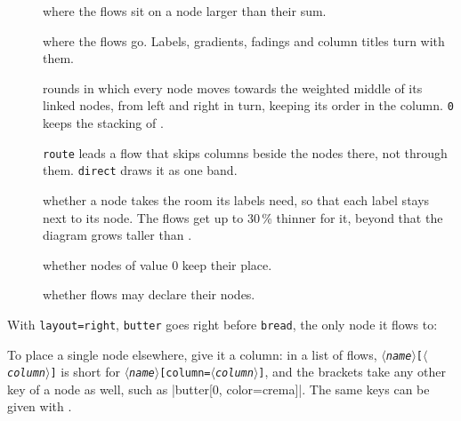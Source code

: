\documentclass[10pt,parskip=half,english,numbers=noenddot,footnotes=nomultiple,oneside]{scrartcl}
\let\T\texttt
\newcommand\meta[1]{\ensuremath{\langle}\textit{#1}\ensuremath{\rangle}}
\begin{document}
\begin{description}
\item[] where the flows sit on a node larger than their sum.
\item[] where the flows go. Labels, gradients, fadings and column titles turn with them.
\item[\key{relax}{\meta{rounds}}] rounds in which every node moves towards the weighted middle of its linked nodes, from left and right in turn, keeping its order in the column. \T{0} keeps the stacking of .
\item[] \T{route} leads a flow that skips columns beside the nodes there, not through them. \T{direct} draws it as one band.
\item[] whether a node takes the room its labels need, so that each label stays next to its node. The flows get up to 30\,\% thinner for it, beyond that the diagram grows taller than .
\item[] whether nodes of value 0 keep their place.
\item[] whether flows may declare their nodes.
\end{description}
With \T{layout=right}, \T{butter} goes right before \T{bread}, the only node it flows to:
\begin{example}
\end{example}
To place a single node elsewhere, give it a column: in a list of flows, \T{\meta{name}[\meta{column}]} is short for \T{\meta{name}[column=\meta{column}]}, and the brackets take any other key of a node as well, such as |butter[0, color=crema]|. The same keys can be given with .
\begin{example}
\end{example}
\begin{example}
\end{example}
\end{document}
